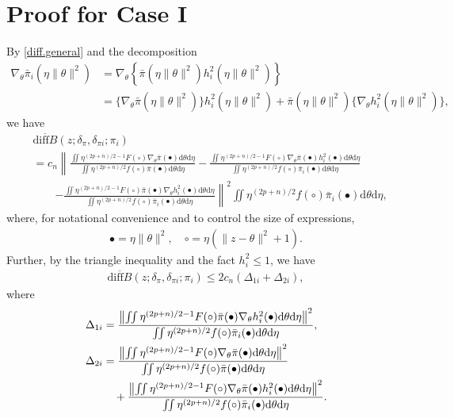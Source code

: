 \documentclass[preprint,11pt]{imsart}
\numberwithin{equation}{section}
\theoremstyle{plain}
\theoremstyle{definition}
\theoremstyle{remark}
\newcommand{\rd}{\mathrm{d}}
\newcommand{\oldiff}{\overline{\mathrm{diff}B}}
\begin{document}
 \section{Proof for Case I}
\label{sec:caseI}
By \eqref{diff.general} and the decomposition
\begin{align*}
 \nabla_\theta\bar{\pi}_i(\eta\|\theta\|^2)
 &= \nabla_\theta\left\{\bar{\pi}(\eta\|\theta\|^2)h_i^2(\eta\|\theta\|^2)\right\}\\
 &=\{\nabla_\theta\bar{\pi}(\eta\|\theta\|^2)\}h_i^2(\eta\|\theta\|^2)
+\bar{\pi}(\eta\|\theta\|^2)\{\nabla_\theta h_i^2(\eta\|\theta\|^2)\},
\end{align*}
 we have
\begin{align*}
& \oldiff(z;\delta_\pi,\delta_{\pi i};\pi_i) \\ 
&=c_n\left\|\frac{\iint 
  \eta^{(2p+n)/2-1} F(\circ) 
 \nabla_\theta\bar{\pi}(\bullet) \rd \theta   \rd \eta}
 {\iint 
  \eta^{(2p+n)/2} f(\circ) 
\bar{\pi}(\bullet) \rd \theta   \rd \eta}
- \frac{\iint 
  \eta^{(2p+n)/2-1} F(\circ) 
\nabla_\theta\bar{\pi}(\bullet)h_i^2(\bullet) \rd \theta   \rd \eta}
 {\iint 
  \eta^{(2p+n)/2} f(\circ) 
\bar{\pi}_i(\bullet) \rd \theta   \rd \eta} \right. \\
 &\qquad \left.
- \frac{\iint 
  \eta^{(2p+n)/2-1} F(\circ) 
\bar{\pi}(\bullet)\nabla_\theta h_i^2(\bullet) \rd \theta   \rd \eta}
 {\iint 
  \eta^{(2p+n)/2} f(\circ) 
\bar{\pi}_i(\bullet) \rd \theta   \rd \eta}\right\|^2 
 \iint\eta^{(2p+n)/2} f(\circ) 
\bar{\pi}_i(\bullet) \rd \theta   \rd \eta,
\end{align*}
where, for notational convenience and to control the size of expressions,
\begin{align*}
 \bullet=\eta\|\theta\|^2, \quad \circ=\eta(\|z-\theta\|^2+1).
\end{align*}
Further, by the triangle inequality and the fact $h_i^2\leq 1$, we have
\begin{align*}
\oldiff(z;\delta_\pi,\delta_{\pi i};\pi_i)
 \leq 2c_n(\Delta_{1i}+\Delta_{2i}),
\end{align*}
where
\begin{align}
 \Delta_{1i}
& =
\frac{\left\| \iint 
  \eta^{(2p+n)/2-1} F(\circ) 
\bar{\pi}(\bullet)\nabla_\theta h_i^2(\bullet) \rd \theta   \rd \eta \right\|^2 }
 {\iint \eta^{(2p+n)/2} f(\circ) \bar{\pi}_i(\bullet) \rd \theta   \rd \eta}, \label{eq:deldel1}\\
\Delta_{2i}
 &=
 \frac{\left\|\iint   \eta^{(2p+n)/2-1} F(\circ) \nabla_\theta\bar{\pi}(\bullet) \rd \theta   \rd \eta \right\|^2}
 {\iint \eta^{(2p+n)/2} f(\circ) \bar{\pi}(\bullet) \rd \theta   \rd \eta} \notag\\ 
 &\quad +
\frac{\left\|\iint  \eta^{(2p+n)/2-1} F(\circ) 
\nabla_\theta\bar{\pi}(\bullet)h_i^2(\bullet) \rd \theta   \rd \eta \right\|^2}
 {\iint \eta^{(2p+n)/2} f(\circ) \bar{\pi}_i(\bullet) \rd \theta   \rd \eta}. \label{eq:deldel3}
\end{align}
\end{document}
